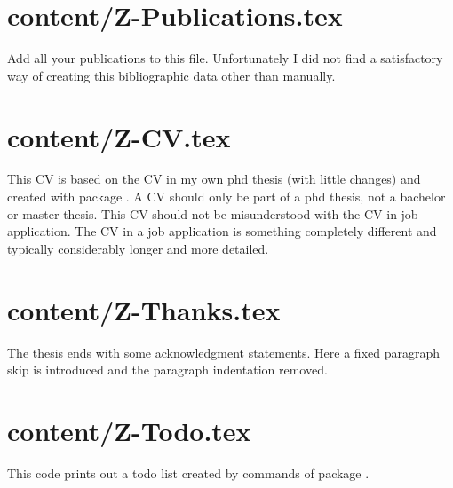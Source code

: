 
\section{content/Z-Publications.tex}

Add all your publications to this file. Unfortunately I did not find a satisfactory way of creating this bibliographic data other than manually.


\section{content/Z-CV.tex}

This CV is based on the CV in my own phd thesis (with little changes) and created with package . A CV should only be part of a phd thesis, not a bachelor or master thesis. This CV should not be misunderstood with the CV in job application. The CV in a job application is something completely different and typically considerably longer and more detailed.


\section{content/Z-Thanks.tex}

The thesis ends with some acknowledgment statements. Here a fixed paragraph skip is introduced and the paragraph indentation removed.


\section{content/Z-Todo.tex}

This code prints out a todo list created by commands of package .

